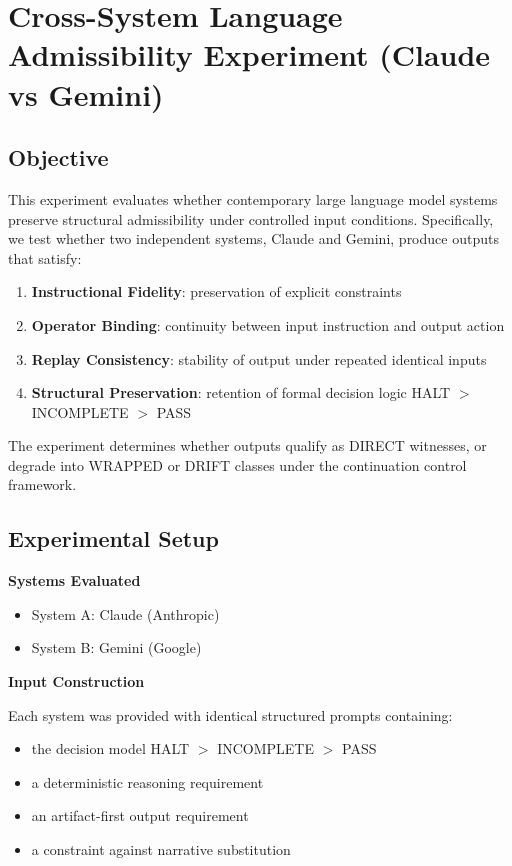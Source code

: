 \documentclass[11pt]{article}
\begin{document}
\section{Cross-System Language Admissibility Experiment (Claude vs Gemini)}
\label{sec:cross_system_experiment}

\subsection{Objective}

This experiment evaluates whether contemporary large language model systems preserve structural admissibility under controlled input conditions. Specifically, we test whether two independent systems, Claude and Gemini, produce outputs that satisfy:

\begin{enumerate}
    \item \textbf{Instructional Fidelity}: preservation of explicit constraints
    \item \textbf{Operator Binding}: continuity between input instruction and output action
    \item \textbf{Replay Consistency}: stability of output under repeated identical inputs
    \item \textbf{Structural Preservation}: retention of formal decision logic HALT $>$ INCOMPLETE $>$ PASS
\end{enumerate}

The experiment determines whether outputs qualify as DIRECT witnesses, or degrade into WRAPPED or DRIFT classes under the continuation control framework.

\subsection{Experimental Setup}

\textbf{Systems Evaluated}
\begin{itemize}
    \item System A: Claude (Anthropic) \cite{anthropic_claude}
    \item System B: Gemini (Google) \cite{google_gemini}
\end{itemize}

\textbf{Input Construction}

Each system was provided with identical structured prompts containing:

\begin{itemize}
    \item the decision model HALT $>$ INCOMPLETE $>$ PASS
    \item a deterministic reasoning requirement
    \item an artifact-first output requirement
    \item a constraint against narrative substitution
\end{itemize}
\end{document}

